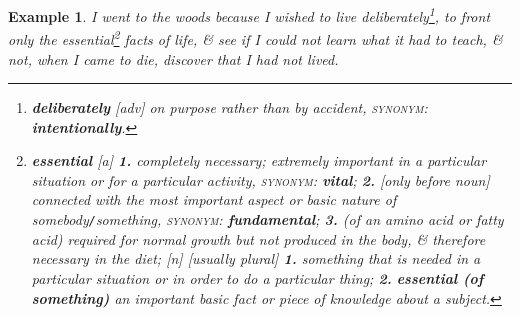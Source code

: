 \documentclass[oneside]{book}
\numberwithin{equation}{section}
\newtheorem{example}{Example}[chapter]
\begin{document}
\begin{example}
	I went to the woods because I wished to live deliberately\footnote{\textbf{deliberately} [adv] on purpose rather than by accident, \textsc{synonym}: \textbf{intentionally}.}, to front only the essential\footnote{\textbf{essential} [a] \textbf{1.} completely necessary; extremely important in a particular situation or for a particular activity, \textsc{synonym}: \textbf{vital}; \textbf{2.} [only before noun] connected with the most important aspect or basic nature of somebody\texttt{/}something, \textsc{synonym}: \textbf{fundamental}; \textbf{3.} (of an amino acid or fatty acid) required for normal growth but not produced in the body, \& therefore necessary in the diet; [n] [usually plural] \textbf{1.} something that is needed in a particular situation or in order to do a particular thing; \textbf{2.} \textbf{essential (of something)} an important basic fact or piece of knowledge about a subject.} facts of life, \& see if I could not learn what it had to teach, \& not, when I came to die, discover that I had not lived.
\end{example}
\end{document}
